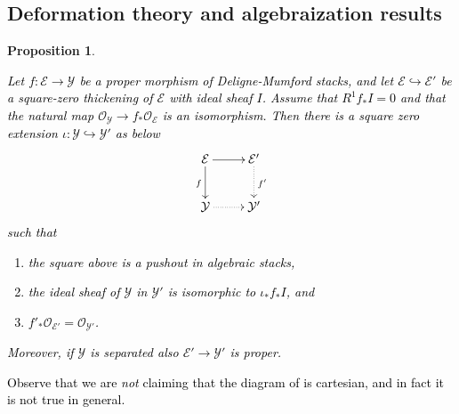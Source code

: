 \documentclass{amsart}
\newcommand{\cE}{\mathcal{E}}
\newcommand{\cO}{\mathcal{O}}
\newcommand{\cY}{\mathcal{Y}}
\newtheorem{Prop}[theorem]{Proposition}
\theoremstyle{definition}
\begin{document}
\subsection{Deformation theory and algebraization results}
\begin{Prop}\label{prop_extension_of_Y}
   \textcolor{black}{Let $f:\cE\to \cY$ be a proper morphism of Deligne-Mumford stacks, and let $\cE\hookrightarrow \cE'$ be a square-zero thickening of $\cE$ with ideal sheaf $I$. Assume that $R^1f_*I=0$ and that the natural map $\cO_{\cY}\to f_*\cO_\cE$ is an isomorphism. Then there is a square zero extension $\iota:\cY\hookrightarrow \cY'$ as below
   $$\xymatrix{\cE\ar[r] \ar[d]_f & \cE'\ar@{..>}[d]^{f'} \\ \cY\ar@{..>}[r] & \cY'}$$
   such that \begin{enumerate}
   \item the square above is a pushout in algebraic stacks,
        \item the ideal sheaf of $\cY$ in $\cY'$ is isomorphic to $\iota_*f_*I$, and
        \item $f'_*\cO_{\cE'}=\cO_{\cY'}$.
    \end{enumerate}
    Moreover, if $\cY$ is separated also $\cE'\to \cY'$ is proper.}
\end{Prop}
\textcolor{black}{Observe that we are \emph{not} claiming that the diagram of  is cartesian,
and in fact it is not true in general.}
\end{document}
